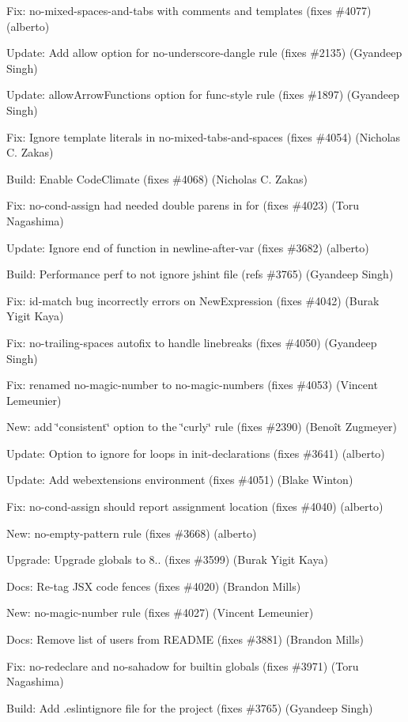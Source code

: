 \begin{DoxyItemize}
\item Fix\+: no-\/mixed-\/spaces-\/and-\/tabs with comments and templates (fixes \#4077) (alberto)
\item Update\+: Add {\ttfamily allow} option for {\ttfamily no-\/underscore-\/dangle} rule (fixes \#2135) (Gyandeep Singh)
\item Update\+: {\ttfamily allow\+Arrow\+Functions} option for {\ttfamily func-\/style} rule (fixes \#1897) (Gyandeep Singh)
\item Fix\+: Ignore template literals in no-\/mixed-\/tabs-\/and-\/spaces (fixes \#4054) (Nicholas C. Zakas)
\item Build\+: Enable Code\+Climate (fixes \#4068) (Nicholas C. Zakas)
\item Fix\+: {\ttfamily no-\/cond-\/assign} had needed double parens in {\ttfamily for} (fixes \#4023) (Toru Nagashima)
\item Update\+: Ignore end of function in newline-\/after-\/var (fixes \#3682) (alberto)
\item Build\+: Performance perf to not ignore jshint file (refs \#3765) (Gyandeep Singh)
\item Fix\+: id-\/match bug incorrectly errors on {\ttfamily New\+Expression} (fixes \#4042) (Burak Yigit Kaya)
\item Fix\+: {\ttfamily no-\/trailing-\/spaces} autofix to handle linebreaks (fixes \#4050) (Gyandeep Singh)
\item Fix\+: renamed no-\/magic-\/number to no-\/magic-\/numbers (fixes \#4053) (Vincent Lemeunier)
\item New\+: add \char`\"{}consistent\char`\"{} option to the \char`\"{}curly\char`\"{} rule (fixes \#2390) (Benoît Zugmeyer)
\item Update\+: Option to ignore for loops in init-\/declarations (fixes \#3641) (alberto)
\item Update\+: Add webextensions environment (fixes \#4051) (Blake Winton)
\item Fix\+: no-\/cond-\/assign should report assignment location (fixes \#4040) (alberto)
\item New\+: no-\/empty-\/pattern rule (fixes \#3668) (alberto)
\item Upgrade\+: Upgrade globals to 8.. (fixes \#3599) (Burak Yigit Kaya)
\item Docs\+: Re-\/tag J\+SX code fences (fixes \#4020) (Brandon Mills)
\item New\+: no-\/magic-\/number rule (fixes \#4027) (Vincent Lemeunier)
\item Docs\+: Remove list of users from R\+E\+A\+D\+ME (fixes \#3881) (Brandon Mills)
\item Fix\+: {\ttfamily no-\/redeclare} and {\ttfamily no-\/sahadow} for builtin globals (fixes \#3971) (Toru Nagashima)
\item Build\+: Add {\ttfamily .eslintignore} file for the project (fixes \#3765) (Gyandeep Singh)
\end{DoxyItemize}

